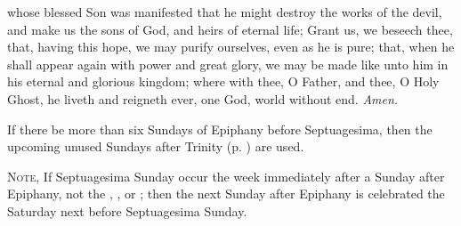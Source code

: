 

\collect
{} whose blessed Son was manifested that he might destroy the works of the devil, and make us the sons of God, and heirs of eternal life; Grant us, we beseech thee, that, having this hope, we may purify ourselves, even as he is pure; that, when he shall appear again with power and great glory, we may be made like unto him in his eternal and glorious kingdom; where with thee, O Father, and thee, O Holy Ghost, he liveth and reigneth ever, one God, world without end. \textit{Amen.}

\begin{rubric}
    If there be more than six Sundays of Epiphany before Septuagesima, then the upcoming unused Sundays after Trinity (p. \pageref{trinity}) are used.
\end{rubric}

\begin{rubric}
	\textsc{Note,} If Septuagesima Sunday occur the week immediately after a Sunday after Epiphany, not the , , or ; then the next Sunday after Epiphany is celebrated the Saturday next before Septuagesima Sunday.
\end{rubric}





\\


\\


